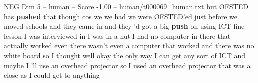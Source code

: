 \begin{textsample}{NEG Dim 5 – human – Score -1.00 – human/t000069\_human.txt}  \label{ex:f5_neg_039}
but OFSTED has \textbf{pushed} that though cos we we had we were OFSTED'ed just before we moved schools and they came in and they 'd got a big \textbf{push} on using ICT fine lesson I was interviewed in I was in a hut I had no computer in there that actually worked even there wasn't even a computer that worked and there was no white board so I thought well okay the only way I can get any sort of ICT and maybe I 'll use an overhead projector so I used an overhead projector that was a close as I could get to anything

\end{textsample}

